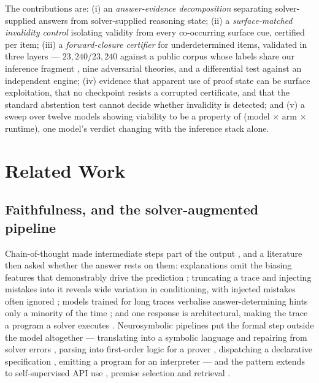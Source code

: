 \documentclass[10pt,twocolumn]{article}
\begin{document}
The contributions are: (i) an \emph{answer-evidence decomposition} separating
solver-supplied answers from solver-supplied reasoning state; (ii) a
\emph{surface-matched invalidity control} isolating validity from every
co-occurring surface cue, certified per item; (iii) a \emph{forward-closure
certifier} for underdetermined items, validated in three layers --- $23{,}240/23{,}240$ against a public corpus whose
labels share our inference fragment \citep{tafjord2020proofwriter}, nine
adversarial theories, and a differential test against an independent engine; (iv) evidence that apparent use of proof state can be surface
exploitation, that no checkpoint resists a corrupted certificate, and that the
standard abstention test cannot decide whether invalidity is detected; and (v) a sweep over twelve models
\citep{team2024qwen,grattafiori2024llama,team2025gemma,microsoft2025phi,team2024olmo,allal2025smollm}
showing viability to be a property of (model $\times$ arm $\times$ runtime), one
model's verdict changing with the inference stack alone.

\section{Related Work}

\subsection{Faithfulness, and the solver-augmented pipeline}

Chain-of-thought made intermediate steps part of the output
\citep{wei2022chainofthought}, and a literature then asked whether the answer
rests on them: explanations omit the biasing features that demonstrably drive the
prediction \citep{turpin2023language}; truncating a trace and injecting mistakes
into it reveals wide variation in conditioning, with injected mistakes often
ignored \citep{lanham2023measuring,arcuschin2025chainofthought}; models trained
for long traces verbalise answer-determining hints only a minority of the time
\citep{chen2025reasoning}; and one response is architectural, making the trace a
program a solver executes \citep{lyu2023faithful}. Neurosymbolic pipelines put
the formal step outside the model altogether --- translating into a symbolic
language and repairing from solver errors \citep{pan2023logiclm}, parsing into
first-order logic for a prover \citep{olausson2023linc}, dispatching a
declarative specification \citep{ye2023satlm}, emitting a program for an
interpreter \citep{gao2022pal} --- and the pattern extends to self-supervised API
use \citep{schick2023toolformer}, premise selection \citep{yang2023leandojo} and
retrieval \citep{lewis2020retrievalaugmented}.
\end{document}
